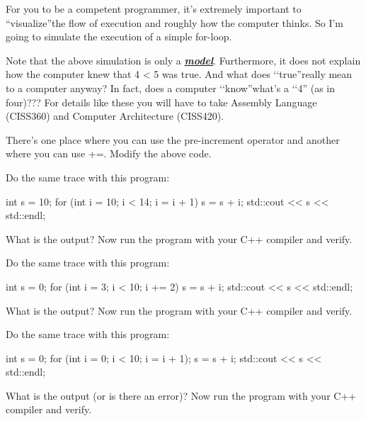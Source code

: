For you to be a competent programmer, it's extremely
important to ``visualize''the flow of execution and roughly how the
computer thinks. So I'm going to simulate the execution
of a simple for-loop.


Note that the above simulation is only a \emph{\textbf{\underline{model}}}.
Furthermore, it does not explain how the computer knew that 4
< 5 was true. And what does \lq\lq true''really mean to a computer
anyway? In fact, does a computer \lq\lq know''what's a \lq\lq 4''
(as in four)??? For details like these you will have to take Assembly
Language (CISS360) and Computer Architecture (CISS420).


\begin{ex}
There's one place where you can use
the pre-increment operator and another where you can use +=. Modify the
above code.
\end{ex}

\begin{ex}
Do the same trace with this program:
\begin{console}
int s = 10;
for (int i = 10; i < 14; i = i + 1)
{   
    s = s + i;
}
std::cout << s << std::endl;
\end{console}
\end{ex}
What is the output? Now run the program with your C++ compiler and
verify.

\begin{ex}
Do the same trace with this program:
\begin{console}
int s = 0;
for (int i = 3; i < 10; i += 2)
{   
    s = s + i;
}
std::cout << s << std::endl;
\end{console}
\end{ex}

What is the output? Now run the program with your C++ compiler and
verify.

\begin{ex}
Do the same trace with this program:
\begin{console}
int s = 0;
for (int i = 0; i < 10; i = i + 1);
    s = s + i;
std::cout << s << std::endl;
\end{console}
\end{ex}
What is the output (or is there an error)? Now run the program with your
C++ compiler and verify.

\newpage{}

